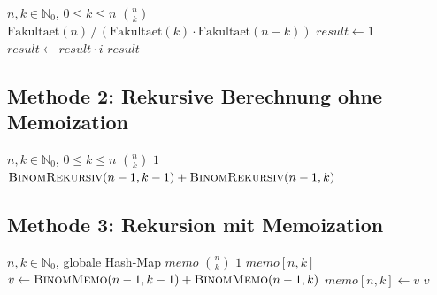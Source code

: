﻿\documentclass[12pt, a4paper]{article}
\newcommand{\myN}{\mathbb{N}}
\theoremstyle{plain}
\theoremstyle{definition}
\theoremstyle{remark}
\begin{document}
\begin{algorithm}[H]
  \caption{Binomialkoeffizient via Fakultätsformel}
  \label{alg:fakultaet}
  \begin{algorithmic}[1]
    \Require $n, k \in \myN_0$, $0 \le k \le n$
    \Ensure $\binom{n}{k}$
      \State \Return $\text{Fakultaet}(n) \,/\, (\text{Fakultaet}(k) \cdot \text{Fakultaet}(n-k))$
    \EndFunction
      \State $result \leftarrow 1$
        \State $result \leftarrow result \cdot i$
      \EndFor
      \State \Return $result$
    \EndFunction
  \end{algorithmic}
\end{algorithm}

\subsection{Methode 2: Rekursive Berechnung ohne Memoization}
\label{subsec:algo_rekursiv}

\begin{algorithm}[H]
  \caption{Binomialkoeffizient rekursiv (ohne Memoization)}
  \label{alg:rekursiv}
  \begin{algorithmic}[1]
    \Require $n, k \in \myN_0$, $0 \le k \le n$
    \Ensure $\binom{n}{k}$
        \State \Return $1$
      \EndIf
      \State \Return $\Call{BinomRekursiv}{n-1, k-1} + \Call{BinomRekursiv}{n-1, k}$
    \EndFunction
  \end{algorithmic}
\end{algorithm}

\subsection{Methode 3: Rekursion mit Memoization}
\label{subsec:algo_memo}

\begin{algorithm}[H]
  \caption{Binomialkoeffizient mit Memoization}
  \label{alg:memo}
  \begin{algorithmic}[1]
    \Require $n, k \in \myN_0$, globale Hash-Map $\textit{memo}$
    \Ensure $\binom{n}{k}$
        \State \Return $1$
      \EndIf
        \State \Return $\textit{memo}[n, k]$
      \EndIf
      \State $v \leftarrow \Call{BinomMemo}{n-1, k-1} + \Call{BinomMemo}{n-1, k}$
      \State $\textit{memo}[n, k] \leftarrow v$
      \State \Return $v$
    \EndFunction
  \end{algorithmic}
\end{algorithm}
\end{document}
